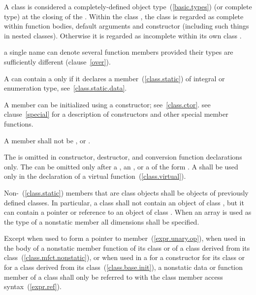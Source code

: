\pnum
{}%
A class is considered a completely-defined object
type~(\ref{basic.types}) (or complete type) at the closing \tcode{\}} of
the .
Within the class
, the class is regarded as complete
within function bodies, default arguments and constructor
(including such things in nested classes).
Otherwise it is regarded as incomplete within its own class
.

\pnum
\enternote
a single name can denote several function members provided their types
are sufficiently different (clause~\ref{over}).
\exitnote

\pnum
A  can contain a
 only if it declares a 
member~(\ref{class.static}) of  integral or 
enumeration type, see~\ref{class.static.data}.

\pnum
A member can be initialized using a constructor; see~\ref{class.ctor}.
\enternote
see clause~\ref{special} for a description of constructors and other
special member functions.
\exitnote

\pnum
A member shall not be , 
or .

\pnum
The  is omitted in constructor, destructor,
and conversion function declarations only.
The
 can be omitted only after a
, an , or a
 of the form 
. A
 shall be used only in the declaration of a
virtual function~(\ref{class.virtual}).

\pnum
{}%
Non-~(\ref{class.static}) members that are class objects
shall be objects of previously defined classes.
In particular, a class  shall not contain an object
of class , but it can contain a pointer or
reference to an object of class .
When an array is used as the type of a nonstatic member all dimensions
shall be specified.

\pnum
Except when used to form a pointer to member~(\ref{expr.unary.op}),
when used in the body of a nonstatic member function of its class or of
a class derived from its class~(\ref{class.mfct.nonstatic}), or when
used in a  for a constructor for its
class or for a class derived from its class~(\ref{class.base.init}),
a nonstatic data or function member of a class shall only be referred
to with the class member access syntax~(\ref{expr.ref}).

